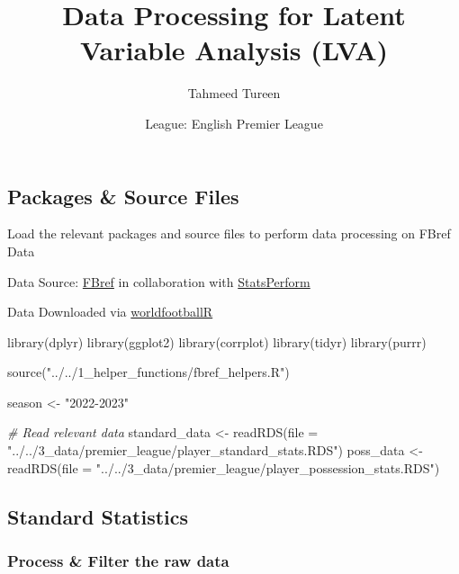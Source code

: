 \documentclass[
]{article}
\title{Data Processing for Latent Variable Analysis (LVA)}
\author{Tahmeed Tureen}
\date{League: English Premier League}
\newenvironment{Shaded}{\begin{snugshade}}{\end{snugshade}}
\newcommand{\AttributeTok}[1]{\textcolor[rgb]{0.77,0.63,0.00}{#1}}
\newcommand{\CommentTok}[1]{\textcolor[rgb]{0.56,0.35,0.01}{\textit{#1}}}
\newcommand{\FunctionTok}[1]{\textcolor[rgb]{0.00,0.00,0.00}{#1}}
\newcommand{\NormalTok}[1]{#1}
\newcommand{\OtherTok}[1]{\textcolor[rgb]{0.56,0.35,0.01}{#1}}
\newcommand{\StringTok}[1]{\textcolor[rgb]{0.31,0.60,0.02}{#1}}
\begin{document}
\maketitle

\hypertarget{packages-source-files}{%
\subsection{Packages \& Source Files}\label{packages-source-files}}

Load the relevant packages and source files to perform data processing
on FBref Data

Data Source: \href{https://fbref.com/en/}{FBref} in collaboration with
\href{https://www.statsperform.com/}{StatsPerform}

Data Downloaded via
\href{https://jaseziv.github.io/worldfootballR/index.html}{worldfootballR}

\begin{Shaded}
\begin{Highlighting}[]
\FunctionTok{library}\NormalTok{(dplyr)}
\FunctionTok{library}\NormalTok{(ggplot2)}
\FunctionTok{library}\NormalTok{(corrplot)}
\FunctionTok{library}\NormalTok{(tidyr)}
\FunctionTok{library}\NormalTok{(purrr)}

\FunctionTok{source}\NormalTok{(}\StringTok{"../../1\_helper\_functions/fbref\_helpers.R"}\NormalTok{)}

\NormalTok{season }\OtherTok{\textless{}{-}} \StringTok{"2022{-}2023"}

\CommentTok{\# Read relevant data}
\NormalTok{standard\_data }\OtherTok{\textless{}{-}} \FunctionTok{readRDS}\NormalTok{(}\AttributeTok{file =} \StringTok{"../../3\_data/premier\_league/player\_standard\_stats.RDS"}\NormalTok{)}
\NormalTok{poss\_data }\OtherTok{\textless{}{-}} \FunctionTok{readRDS}\NormalTok{(}\AttributeTok{file =} \StringTok{"../../3\_data/premier\_league/player\_possession\_stats.RDS"}\NormalTok{)}
\end{Highlighting}
\end{Shaded}

\hypertarget{standard-statistics}{%
\subsection{Standard Statistics}\label{standard-statistics}}

\hypertarget{process-filter-the-raw-data}{%
\subsubsection{Process \& Filter the raw
data}\label{process-filter-the-raw-data}}
\end{document}

